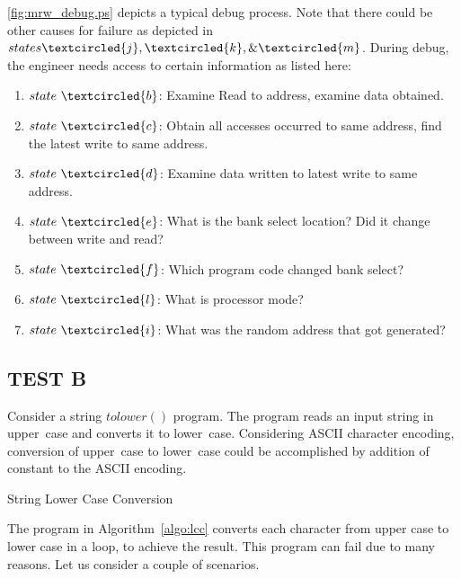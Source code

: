 \figurename{\ref{fig:mrw_debug.ps}} depicts a typical debug process. Note that there could be other causes for failure as depicted in $states \textcircled{j}, \textcircled{k}, \& \textcircled{m}$. During debug, the engineer needs access to certain information as listed here:
\begin{enumerate}
\item $state~\textcircled{b}$: Examine Read to address, examine data obtained.
\item $state~\textcircled{c}$: Obtain all accesses occurred to same address, find the latest write to same address.
\item $state~\textcircled{d}$: Examine data written to latest write to same address.
\item $state~\textcircled{e}$: What is the bank select location? Did it change between write and read?
\item $state~\textcircled{f}$: Which program code changed bank select?
\item $state~\textcircled{l}$: What is processor mode?
\item $state~\textcircled{i}$: What was the random address that got generated?
\end{enumerate}

\subsection {TEST B}
\label{case:testb}
Consider a string $tolower()$ program. The program reads an input string in upper~case and converts it to lower~case. Considering ASCII character encoding, conversion of upper~case to lower~case could be accomplished by addition of constant to the ASCII encoding.



\IncMargin{1em}
\begin{algorithm}[h]
\DontPrintSemicolon
{}

\BlankLine
 \caption{String Lower Case Conversion}
\label{algo:lcc}
\end{algorithm}\DecMargin{1em}


The program in Algorithm~\ref{algo:lcc} converts each character from upper case to lower case in a loop, to achieve the result. This program can fail due to many reasons. Let us consider a couple of scenarios.

